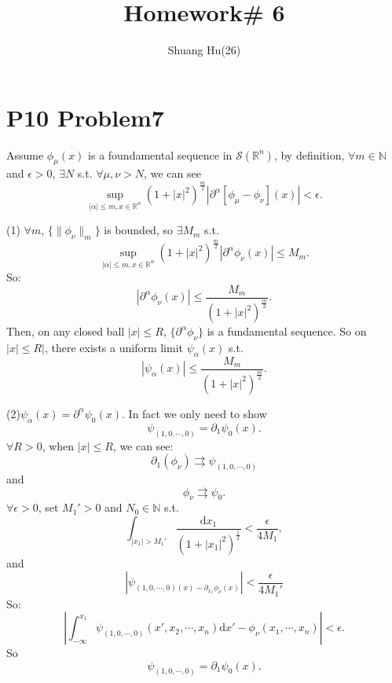 \documentclass[a4paper]{ctexart}
\title{Homework\# 6}
\author{Shuang Hu(26)}
\newcommand{\dif}{\mathrm{d}}
\begin{document}
\maketitle
\section*{P10 Problem7}
Assume $\phi_{\mu}(x)$ is a foundamental sequence in $\mathscr{S}(\mathbb{R}^{n})$, by definition, $\forall m\in\mathbb{N}$ and $\epsilon>0$, $\exists N$ s.t. $\forall \mu,\nu>N$, we can see 
\begin{equation}
    \label{defn:complete}
    \sup_{|\alpha|\le m,x\in\mathbb{R}^{n}}(1+|x|^{2})^{\frac{m}{2}}|\partial^{\alpha}[\phi_{\mu}-\phi_{\nu}](x)|<\epsilon.
\end{equation}

(1) $\forall m$, $\{\|\phi_{\nu}\|_{m}\}$ is bounded, so $\exists M_{m}$ s.t.
\begin{equation}
    \sup_{|\alpha|\le m,x\in\mathbb{R}^{n}}(1+|x|^{2})^{\frac{m}{2}}|\partial^{\alpha}\phi_{\nu}(x)|\le M_{m}.
\end{equation}
So:
\begin{equation}
    |\partial^{\alpha}\phi_{\nu}(x)|\le\frac{M_{m}}{(1+|x|^{2})^{\frac{m}{2}}}.
\end{equation}
Then, on any closed ball $|x|\le R$, $\{\partial^{\alpha}\phi_{\nu}\}$ is a fundamental sequence. So on $|x|\le R|$, there exists a uniform limit $\psi_{\alpha}(x)$ s.t.
\begin{equation}
    |\psi_{\alpha}(x)|\le\frac{M_{m}}{(1+|x|^{2})^{\frac{m}{2}}}.
\end{equation}

(2)$\psi_{\alpha}(x)=\partial^{\alpha}\psi_{0}(x)$. In fact we only need to show 
\begin{equation}
    \psi_{(1,0,\cdots,0)}=\partial_{1}\psi_{0}(x).
\end{equation}
$\forall R>0$, when $|x|\le R$, we can see:
\begin{equation}
    \partial_{1}(\phi_{\nu})\rightrightarrows\psi_{(1,0,\cdots,0)}
\end{equation}
and
\begin{equation}
    \phi_{\nu}\rightrightarrows\psi_{0}.
\end{equation}
$\forall\epsilon>0$, set $M_{1}'>0$ and $N_{0}\in\mathbb{N}$ s.t.
\begin{equation}
    \int_{|x_{1}|>M_{1}'}\frac{\dif x_{1}}{(1+|x_{1}|^{2})^{\frac{1}{2}}}<\frac{\epsilon}{4M_{1}},
\end{equation}
and
\begin{equation}
    |\psi_{(1,0,\cdots,0)(x)-\partial_{x_{1}}\phi_{\nu}(x)}|<\frac{\epsilon}{4M_{1}'}
\end{equation}
So:
\begin{equation}
    |\int_{-\infty}^{x_{1}}\psi_{(1,0,\cdots,0)}(x',x_{2},\cdots,x_{n})\dif x'-\phi_{\nu}(x_{1},\cdots,x_{n})|<\epsilon.
\end{equation}
So 
\begin{equation}
    \psi_{(1,0,\cdots,0)}=\partial_{1}\psi_{0}(x).
\end{equation}
\end{document}
